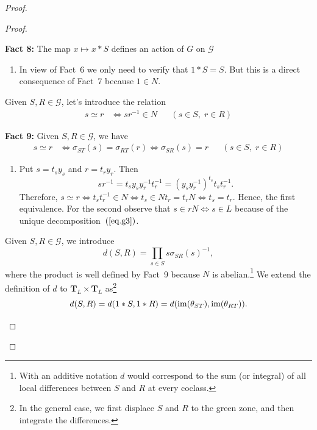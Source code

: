 \begin{proof}
\begin{proof}
\begin{enumerate}[a),font=\upshape]
    \textbf{Fact 8:} The map $x\mapsto x\ast S$ defines an action of $G$ on $\mathcal G$
    
    {\small
    \begin{enumerate}
        \item[$\to$]
        In view of Fact~6 we only need to verify that $1\ast S=S$. But this is a direct consequence of Fact~7 because $1\in N$.
    \end{enumerate}
    }
    
    \medskip
    
    Given $S,R\in\mathcal G$, let's introduce the relation
    \begin{align*}
        s\simeq r&\iff sr^{-1}\in N    &&(s\in S,\;r\in R)
    \end{align*}
    
    \medskip
    
    \textbf{Fact 9:} Given $S, R\in\mathcal G$, we have
        \begin{align*}
            s\simeq r&\iff\sigma_{ST}(s)=\sigma_{RT}(r)\iff\sigma_{SR}(s)=r &&(s\in S,\;r\in R)
        \end{align*}
    {\small
    \begin{enumerate}
        \item[$\to$]
        Put $s=t_sy_s$ and $r=t_ry_r$. Then
        $$
            sr^{-1} = t_sy_sy_r^{-1}t_r^{-1} = (y_sy_r^{-1})^{t_s}t_st_r^{-1}.
        $$
        Therefore, $s\simeq r\iff t_st_r^{-1}\in N\iff t_s\in Nt_r=t_rN\iff t_s=t_r$. Hence, the first equivalence. For the second observe that $s\in rN\iff s\in L$ because of the unique decomposition~$(\ref{eq.g3})$.
    \end{enumerate}
    }

    \medskip
    
    Given $S,R\in\mathcal G$, we introduce
    $$
        d(S,R) = \prod_{s\in S}s\sigma_{SR}(s)^{-1},
    $$
    where the product is well defined by Fact~9 because $N$ is abelian.\footnote{With an additive notation $d$ would correspond to the sum (or integral) of all local differences between $S$ and $R$ at every coclass.} We extend the definition of $d$ to $\mathbf T_L\times\mathbf T_L$ as\footnote{In the general case, we first displace $S$ and $R$ to the green zone, and then integrate the differences.}
    $$
        d(S,R) = d(1\ast S,1\ast R)
            = d(\operatorname{im}(\theta_{ST}),\operatorname{im}(\theta_{RT})).
    $$


\end{enumerate}
\end{proof}
\end{proof}
